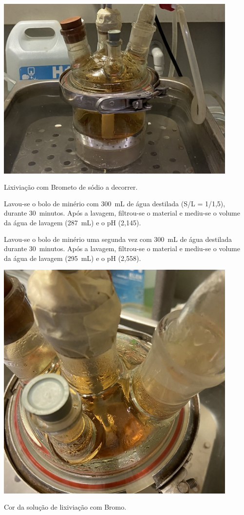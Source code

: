 \begin{marginfigure}[\baselineskip]
    \centering
    \includegraphics[width=0.9\textwidth]{figures/Lixiviação Bromo Refeito}
    \caption{Lixiviação com Brometo de sódio a decorrer.}
    \label{fig:lix-bromo2}
\end{marginfigure}

Lavou-se o bolo de minério com 300~mL de água destilada (S/L = 1/1,5), durante 30~minutos.
Após a lavagem, filtrou-se o material e mediu-se o volume da água de lavagem (287~mL) e o pH (2,145).

Lavou-se o bolo de minério uma segunda vez com 300~mL de água destilada durante 30~minutos.
Após a lavagem, filtrou-se o material e mediu-se o volume da água de lavagem (295~mL) e o pH (2,558).

\begin{marginfigure}[0.5cm]
    \centering
    \includegraphics[width=0.9\textwidth]{figures/Lixiviação Bromo Refeito de perto}
    \caption{Cor da solução de lixiviação com Bromo.}
    \label{fig:cor-lix-bromo2}
\end{marginfigure}

